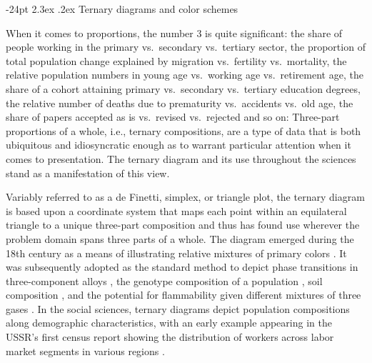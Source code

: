 \documentclass[10pt,twoside,reqno]{article}
\makeatletter
\newcounter{authorcount}
\renewcommand\section{\@startsection {section}{1}{\z@}%
                                   {-24pt}%
                                   {2.3ex \@plus.2ex}%
                                   {\normalfont\large\bfseries}}
\makeatother
\begin{document}
\setlength{\parskip}{0ex}


\setcounter{footnote}{\value{authorcount}}
\newpage
\pagestyle{regular}

\hypertarget{ternary-diagrams-and-color-schemes}{%
\section{Ternary diagrams and color
schemes}\label{ternary-diagrams-and-color-schemes}}

When it comes to proportions, the number 3 is quite significant: the
share of people working in the primary vs.~secondary vs.~tertiary
sector, the proportion of total population change explained by migration
vs.~fertility vs.~mortality, the relative population numbers in young
age vs.~working age vs.~retirement age, the share of a cohort attaining
primary vs.~secondary vs.~tertiary education degrees, the relative
number of deaths due to prematurity vs.~accidents vs.~old age, the share
of papers accepted as is vs.~revised vs.~rejected and so on: Three-part
proportions of a whole, i.e., ternary compositions, are a type of data
that is both ubiquitous and idiosyncratic enough as to warrant
particular attention when it comes to presentation. The ternary diagram
and its use throughout the sciences stand as a manifestation of this
view.

Variably referred to as a de Finetti, simplex, or triangle plot, the
ternary diagram is based upon a coordinate system that maps each point
within an equilateral triangle to a unique three-part composition and
thus has found use wherever the problem domain spans three parts of a
whole. The diagram emerged during the 18th century as a means of
illustrating relative mixtures of primary colors \citep{Howarth1996}. It
was subsequently adopted as the standard method to depict phase
transitions in three-component alloys \citep{Bancroft1897}, the genotype
composition of a population \citep{DeFinetti1926}, soil composition
\citep{Davis1927}, and the potential for flammability given different
mixtures of three gases \citep{Zabetakis1965}. In the social sciences,
ternary diagrams depict population compositions along demographic
characteristics, with an early example appearing in the USSR's first
census report showing the distribution of workers across labor market
segments in various regions \citep{Kvitkin1932}.
\end{document}
